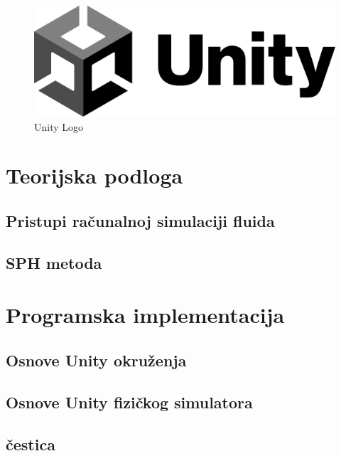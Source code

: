 \documentclass[diplomskirad]{fer}
\begin{document}
    \begin{figure}[H]
        \centering
        \includegraphics[scale=0.3]{images/unityLogo}
        \caption{
            Unity Logo \cite{unityLogo}
        }
        \label{fig:unityLogo}
    \end{figure}



    \chapter{Teorijska podloga}\label{ch:teorijska-podloga}

    \section{Pristupi računalnoj simulaciji fluida}\label{sec:pristupi-racunalnoj-simulaciji-fluida}

    \section{SPH metoda}\label{sec:sph-metoda}


    \chapter{Programska implementacija}\label{ch:programska-implementacija}

    \section{Osnove Unity okruženja}\label{sec:osnove-unity-okruzenja}
    \section{Osnove Unity fizičkog simulatora}\label{sec:osnove-unity-fizickog-simulatora}
    \section{čestica}\label{sec:cestica}
\end{document}
